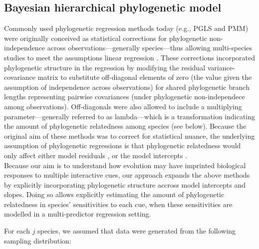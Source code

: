\documentclass{article}\usepackage[]{graphicx}\usepackage[]{color}
\begin{document}
\subsection*{Bayesian hierarchical phylogenetic model}
Commonly used phylogenetic regression methods today (e.g., PGLS and PMM) were originally conceived as statistical corrections for phylogenetic non-independence across observations---generally species---thus allowing multi-species studies to meet the assumptions linear regression \citep{freckleton2002phylogenetic}. These corrections incorporated phylogenetic structure in the regression by modifying the residual variance-covariance matrix to substitute off-diagonal elements of zero (the value given the assumption of independence across observations) for shared phylogenetic branch lengths representing pairwise covariances (under phylogenetic non-independece among observations). Off-diagonals were also allowed to include a multiplying parameter---generally referred to as lambda---which is a transformation indicating the amount of phylogenetic relatedness among species (see below). Because the original aim of these methods was to correct for statistical nuance, the underlying assumption of phylogenetic regressions is that phylogenetic relatedness would only affect either model residuals \citep[in PGLS approaches,][]{freckleton2002phylogenetic}, or the model intercepts \citep[e.g., in many PMM approaches,][]{housworth2004phylogenetic}.\\ 

Because our aim is to understand how evolution may have imprinted biological responses to multiple interactive cues, our approach expands the above methods by explicitly incorporating phylogenetic structure accross model intercepts and slopes. Doing so allows explicitly estimating the amount of phylogenetic relatedness in species' sensitivities to each cue, when these sensitivities are modelled in a multi-predictor regression setting.  

For each $j$ species, we assumed that data were generated from the following sampling distribution:
\end{document}
